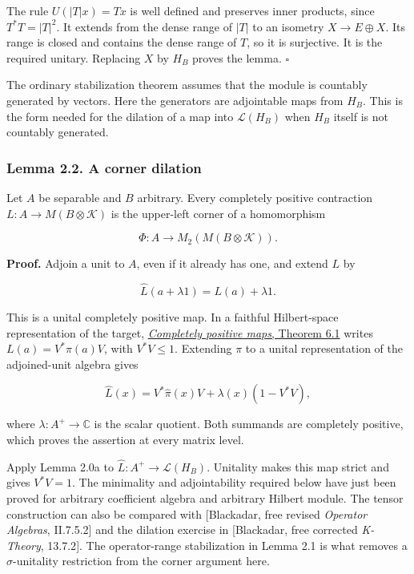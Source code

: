 \documentclass[
  11pt,
]{article}
\begin{document}
The rule \(U(|T|x)=Tx\) is well defined and preserves inner products,
since \(T^*T=|T|^2\). It extends from the dense range of \(|T|\) to an
isometry \(X\to E\oplus X\). Its range is closed and contains the dense
range of \(T\), so it is surjective. It is the required unitary.
Replacing \(X\) by \(H_B\) proves the lemma. \(\square\)

The ordinary stabilization theorem assumes that the module is countably
generated by vectors. Here the generators are adjointable maps from
\(H_B\). This is the form needed for the dilation of a map into
\(\mathcal L(H_B)\) when \(H_B\) itself is not countably generated.

\subsubsection{Lemma 2.2. A corner
dilation}\label{lemma-2.2.-a-corner-dilation}

Let \(A\) be separable and \(B\) arbitrary. Every completely positive
contraction \(L:A\to M(B\otimes\mathcal K)\) is the upper-left corner of
a homomorphism

\[
\Phi:A\longrightarrow M_2(M(B\otimes\mathcal K)).
\]

\textbf{Proof.} Adjoin a unit to \(A\), even if it already has one, and
extend \(L\) by

\[
\widehat L(a+\lambda1)=L(a)+\lambda1.
\]

This is a unital completely positive map. In a faithful Hilbert-space
representation of the target,
\href{https://kokunoyumeto.github.io/open-math-courses/courses/foundations-of-von-neumann-algebras/completely-positive-maps.html}{\emph{Completely
positive maps}, Theorem 6.1} writes \(L(a)=V^*\pi(a)V\), with
\(V^*V\leq1\). Extending \(\pi\) to a unital representation of the
adjoined-unit algebra gives

\[
\widehat L(x)=V^*\widehat\pi(x)V
+\lambda(x)(1-V^*V),
\]

where \(\lambda:A^+\to\mathbb C\) is the scalar quotient. Both summands
are completely positive, which proves the assertion at every matrix
level.

Apply Lemma 2.0a to \(\widehat L:A^+\to\mathcal L(H_B)\). Unitality
makes this map strict and gives \(V^*V=1\). The minimality and
adjointability required below have just been proved for arbitrary
coefficient algebra and arbitrary Hilbert module. The tensor
construction can also be compared with {[}Blackadar, free revised
\emph{Operator Algebras}, II.7.5.2{]} and the dilation exercise in
{[}Blackadar, free corrected \emph{K-Theory}, 13.7.2{]}. The
operator-range stabilization in Lemma 2.1 is what removes a
\(\sigma\)-unitality restriction from the corner argument here.
\end{document}
